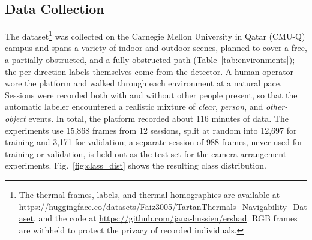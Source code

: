 \subsection{Data Collection}
The dataset\footnote{The thermal frames, labels, and thermal homographies are available at \url{https://huggingface.co/datasets/Faiz3005/TartanThermals_Navigability_Dataset}, and the code at \url{https://github.com/jana-hussien/ershad}. RGB frames are withheld to protect the privacy of recorded individuals.} was collected on
the Carnegie Mellon University in Qatar (CMU-Q) campus and spans a variety of
indoor and outdoor scenes, planned to cover a free, a partially obstructed,
and a fully obstructed path (Table~\ref{tab:environments}); the per-direction
labels themselves come from the detector. A human operator wore
the platform and walked through each environment at a natural pace. Sessions were recorded
both with and without other people present, so that the automatic labeler
encountered a realistic mixture of \textit{clear}, \textit{person}, and
\textit{other-object} events. In total, the platform recorded about 116 minutes of data. The
experiments use 15,868 frames from 12 sessions, split at random into 12,697 for training and 3,171
for validation; a separate session of 988 frames, never used for training
or validation, is held out as the test set for the camera-arrangement
experiments. Fig.~\ref{fig:class_dist} shows the resulting class
distribution.
